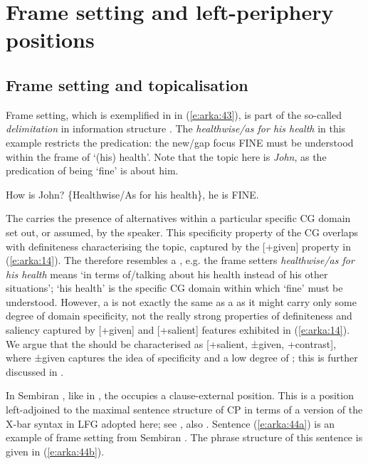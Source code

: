 \documentclass[output=paper
,modfonts
,nonflat]{langsci/langscibook}
\begin{document}
\section{\label{s:arka:6}Frame setting and left-periphery positions}

\subsection{\label{s6.1}Frame setting and topicalisation}

Frame setting, which is exemplified in  in (\ref{e:arka:43}), is part of the so-called \textit{delimitation} in information structure \citep{Krifka2012}. The  \textit{healthwise/as for his health} in this example restricts the predication: the new/gap focus FINE must be understood within the frame of ‘(his) health’. Note that the topic here is \textit{John}, as the predication of being ‘fine’ is about him.

\begin{exe}
	\ex\label{e:arka:43}
	\begin{xlist}
		 How is John?\label{e43q}
		 \{Healthwise/As for his health\}, he is FINE. \citep[31]{Krifka2012}
	\end{xlist}
\end{exe}

\noindent
The  carries the presence of alternatives within a particular specific CG domain set out, or assumed, by the speaker. This specificity property of the CG overlaps with definiteness characterising the topic, captured by the [+given] property in (\ref{e:arka:14}). The  therefore resembles a , e.g. the frame setters \textit{healthwise/as for his health} means ‘in terms of/talking about his health instead of his other situations’; ‘his health’ is the specific CG domain within which ‘fine’ must be understood. However, a  is not exactly the same as a  as it might carry only some degree of domain specificity, not the really strong properties of definiteness and saliency captured by [+given] and [+salient] features exhibited in (\ref{e:arka:14}). We argue that the  should be characterised as [+salient, ±given, +contrast], where ±given captures the idea of specificity and a low degree of ; this is further discussed in .

In Sembiran , like in , the  occupies a clause-external  position. This is a position left-adjoined to the maximal sentence structure of CP in terms of a version of the X-bar syntax in LFG adopted here; see , also \citep{Arka2003}. Sentence (\ref{e:arka:44a}) is an example of frame setting from Sembiran . The phrase structure of this sentence is given in (\ref{e:arka:44b}).
\end{document}
